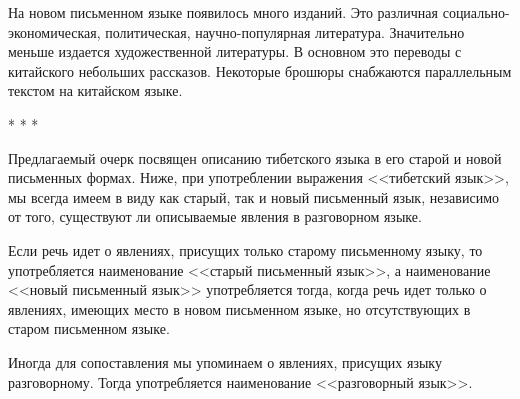 На новом письменном языке появилось много изданий. Это различная социально-экономическая, политическая, научно-популярная литература. Значительно меньше издается художественной литературы. В основном это переводы с китайского небольших рассказов. Некоторые брошюры снабжаются параллельным текстом на китайском языке.

\begin{center}
* * *
\end{center}

Предлагаемый очерк посвящен описанию тибетского языка в его старой и новой письменных формах. Ниже, при употреблении выражения <<тибетский язык>>, мы всегда имеем в виду как старый, так и новый письменный язык, независимо от того, существуют ли описываемые явления в разговорном языке.

Если речь идет о явлениях, присущих только старому письменному языку, то употребляется наименование <<старый письменный язык>>, а наименование <<новый письменный язык>> употребляется тогда, когда речь идет только о явлениях, имеющих место в новом письменном языке, но отсутствующих в старом письменном языке.

Иногда для сопоставления мы упоминаем о явлениях, присущих языку разговорному. Тогда употребляется наименование <<разговорный язык>>.

